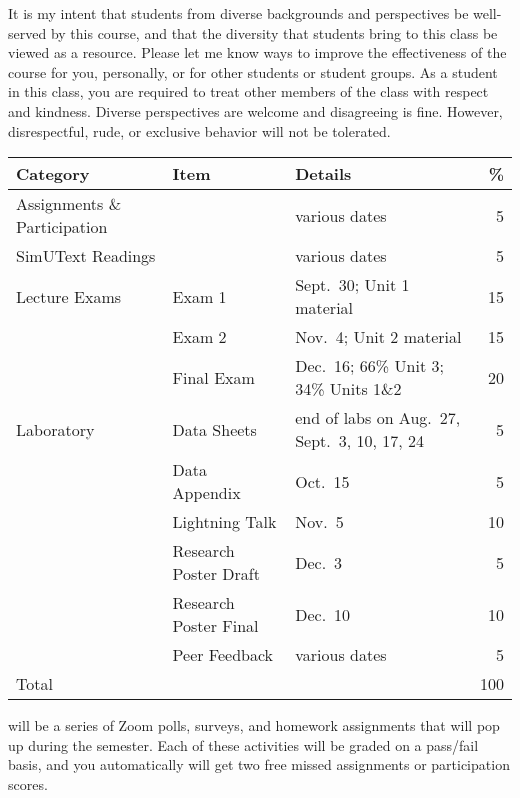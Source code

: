 \documentclass{tufte-handout}
\begin{document}
\begin{fullwidth}
 It is my intent that students from diverse backgrounds and perspectives be well-served by this course, and that the diversity that students bring to this class be viewed as a resource. Please let me know ways to improve the effectiveness of the course for you, personally, or for other students or student groups. As a student in this class, you are required to treat other members of the class with respect and kindness. Diverse perspectives are welcome and disagreeing is fine. However, disrespectful, rude, or exclusive behavior will not be tolerated.


\end{fullwidth}


\begin{fullwidth}

\begin{table}
\begin{tabular}{l l l r}
Category & Item & Details & \% \\
\hline
Assignments \& Participation & & various dates & 5\\
SimUText Readings &  & various dates & 5\\
\hline
Lecture Exams & Exam 1 & Sept.~30; Unit 1 material & 15 \\
& Exam 2 & Nov.~4; Unit 2 material & 15 \\
& Final Exam & Dec.~16; 66\% Unit 3; 34\% Units 1\&2 & 20 \\ 							%
\hline
Laboratory & Data Sheets & end of labs on Aug.~27, Sept.~3, 10, 17, 24 & 5 \\
& Data Appendix & Oct.~15 & 5 \\
& Lightning Talk & Nov.~5 & 10 \\
& Research Poster Draft & Dec.~3 & 5 \\
& Research Poster Final & Dec.~10 & 10 \\
& Peer Feedback & various dates & 5 \\
\hline
Total & & & 100
\end{tabular}
\end{table}



\newpage

 will be a series of Zoom polls, surveys, and homework assignments that will pop up during the semester. Each of these activities will be graded on a pass/fail basis, and you automatically will get two free missed assignments or participation scores. 

\end{fullwidth}
\end{document}
